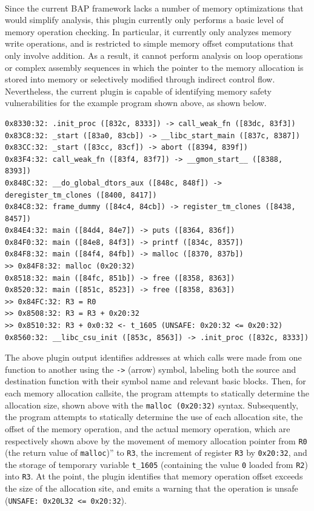 \documentclass[letterpaper,11pt]{article}
\begin{document}
\paragraph{}
Since the current BAP framework lacks a number of memory optimizations that
would simplify analysis, this plugin currently only performs a basic level of
memory operation checking. In particular, it currently only analyzes memory
write operations, and is restricted to simple memory offset computations that
only involve addition. As a result, it cannot perform analysis on loop
operations or complex assembly sequences in which the pointer to the memory
allocation is stored into memory or selectively modified through indirect
control flow. Nevertheless, the current plugin is capable of identifying memory
safety vulnerabilities for the example program shown above, as shown below.

\begin{verbatim}
0x8330:32: .init_proc ([832c, 8333]) -> call_weak_fn ([83dc, 83f3])
0x83C8:32: _start ([83a0, 83cb]) -> __libc_start_main ([837c, 8387])
0x83CC:32: _start ([83cc, 83cf]) -> abort ([8394, 839f])
0x83F4:32: call_weak_fn ([83f4, 83f7]) -> __gmon_start__ ([8388, 8393])
0x848C:32: __do_global_dtors_aux ([848c, 848f]) -> deregister_tm_clones ([8400, 8417])
0x84C8:32: frame_dummy ([84c4, 84cb]) -> register_tm_clones ([8438, 8457])
0x84E4:32: main ([84d4, 84e7]) -> puts ([8364, 836f])
0x84F0:32: main ([84e8, 84f3]) -> printf ([834c, 8357])
0x84F8:32: main ([84f4, 84fb]) -> malloc ([8370, 837b])
>> 0x84F8:32: malloc (0x20:32)
0x8518:32: main ([84fc, 851b]) -> free ([8358, 8363])
0x8520:32: main ([851c, 8523]) -> free ([8358, 8363])
>> 0x84FC:32: R3 = R0
>> 0x8508:32: R3 = R3 + 0x20:32
>> 0x8510:32: R3 + 0x0:32 <- t_1605 (UNSAFE: 0x20:32 <= 0x20:32)
0x8560:32: __libc_csu_init ([853c, 8563]) -> .init_proc ([832c, 8333])
\end{verbatim}

The above plugin output identifies addresses at which calls were made from one
function to another using the \texttt{->} (arrow) symbol, labeling both the source and
destination function with their symbol name and relevant basic blocks. Then, for
each memory allocation callsite, the program attempts to statically determine
the allocation size, shown above with the \texttt{malloc (0x20:32)} syntax.
Subsequently, the program attempts to statically determine the use of each
allocation site, the offset of the memory operation, and the actual memory
operation, which are respectively shown above by the movement of memory
allocation pointer from \texttt{R0} (the return value of \texttt{malloc})” to \texttt{R3}, the
increment of register \texttt{R3} by \texttt{0x20:32}, and the storage of temporary variable
\texttt{t\_1605} (containing the value \texttt{0} loaded from \texttt{R2}) into \texttt{R3}. At the point, the
plugin identifies that memory operation offset exceeds the size of the
allocation site, and emits a warning that the operation is unsafe (\texttt{UNSAFE:
0x20L32 <= 0x20:32}).
\end{document}
